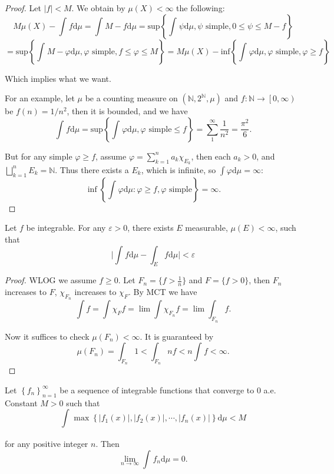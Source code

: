\begin{proof}
	Let $ |f|<M $. We obtain by $ \mu(X)<\infty $ the following:
	$$
		M\mu \left( X \right) -\int_{}^{}{f\mathrm{d} \mu}=\int_{}^{}{M-f\mathrm{d} \mu}
		=\text{sup}\left\{ \int_{}^{}{\psi \mathrm{d} \mu},\psi \text{ simple},0\le \psi \le M-f \right\}
	$$
	$$
		=\text{sup}\left\{ \int_{}^{}{M-\varphi \mathrm{d} \mu},\varphi \text{ simple},f\le \varphi \le M \right\}
		=M\mu \left( X \right) -\text{inf}\left\{ \int_{}^{}{\varphi \mathrm{d} \mu},\varphi \text{ simple},\varphi \ge f \right\}
	$$

	Which implies what we want.

	For an example, let $ \mu $ be a counting measure on $ (\mathbb{N} ,2^\mathbb{N} ,\mu) $ and $ f\colon \mathbb{N} \to \left[0,\infty \right) $ be $ f(n)=1/n^{2} $, then it is bounded, and we have
	$$
		\int_{}^{}{f\mathrm{d} \mu}=\text{sup}\left\{ \int_{}^{}{\varphi \mathrm{d} \mu},\varphi  \text{ simple}\le f \right\} =\sum_1^{\infty}{\frac{1}{n^2}}=\frac{\pi ^2}{6}.
	$$

	But for any simple $ \varphi\ge f $, assume $ \varphi=\sum_{k=1}^n{a_k\chi _{E_k}} $, then each $ a_{k}>0 $, and $
		\bigsqcup_{k=1}^n{E_k}=\mathbb{N}
	$. Thus there exists a $ E_{k} $, which is infinite, so $ \int \varphi \mathrm{d} \mu=\infty $:
	\[
		\inf\left\{ \int_{}^{}{\varphi \mathrm{d}\mu}:\varphi \ge f, \varphi \text{ simple} \right\}  =\infty.
	\]
\end{proof}

\begin{problem}
Let $ f $ be integrable. For any $ \varepsilon>0 $, there exists $ E $ measurable, $ \mu(E)<\infty $, such that
$$
	\bigg|\int_{}^{}{f\mathrm{d} \mu}-\int_E^{}{f\mathrm{d} \mu}\bigg|<\varepsilon
$$
\end{problem}

\begin{proof}
	WLOG we assume $ f\ge 0 $. Let $ F_{n}=\{f>\frac{1}{n}\} $ and $ F=\{f>0\} $, then $ F_{n} $ increases to $ F $, $ \chi_{F_{n}} $ increases to $ \chi_{F} $. By MCT we have
	$$
		\int f=\int \chi _Ff=\lim \int \chi _{F_n}f=\lim \int_{F_n}f.
	$$


	Now it suffices to check $ \mu(F_{n})<\infty $. It is guaranteed by
	$$
		\mu \left( F_n \right) =\int_{F_n}^{}{1}<\int_{F_n}^{}{nf}<n\int_{}^{}{f}<\infty.
	$$
\end{proof}

\begin{problem}
Let $
	\left\{ f_n \right\} _{n=1}^{\infty}
$ be a sequence of integrable functions that converge to $ 0 $ a.e. Constant $ M>0 $ such that
$$
	\int_{}^{}{\max \left\{ |f_1( x ) |,|f_2( x ) |,\cdots ,|f_n( x ) | \right\} \mathrm{d} \mu}<M
$$

for any positive integer $ n $. Then
$$
	\lim_{n\rightarrow \infty}\int_{}^{}{f_n\mathrm{d} \mu}=0.
$$
\end{problem}

